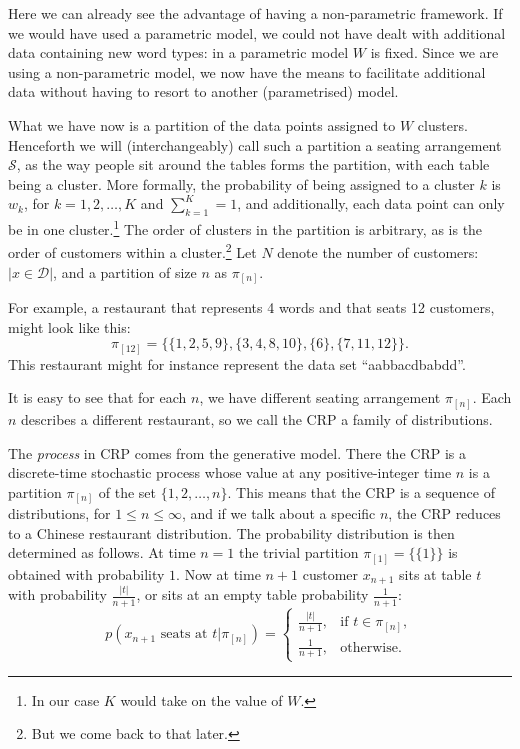 Here we can already see the advantage of having a non-parametric framework. If we would have used a parametric model, we could not have dealt with additional data containing new word types: in a parametric model $W$ is fixed. Since we are using a non-parametric model, we now have the means to facilitate additional data without having to resort to another (parametrised) model.

What we have now is a partition of the data points assigned to $W$ clusters. Henceforth we will (interchangeably) call such a partition a seating arrangement $\mathcal{S}$, as the way people sit around the tables forms the partition, with each table being a cluster. More formally, the probability of being assigned to a cluster $k$ is $w_k$, for $k = 1, 2, \ldots, K$ and $\sum_{k=1}^K = 1$, and additionally, each data point can only be in one cluster.\footnote{In our case $K$ would take on the value of $W$.} The order of clusters in the partition is arbitrary, as is the order of customers within a cluster.\footnote{But we come back to that later.} Let $N$ denote the number of customers: $|x\in\mathcal{D}|$, and a partition of size $n$ as $\pi_{[n]}$. 

For example, a restaurant that represents 4 words and that seats 12 customers, might look like this: 
\begin{equation}\label{eq:partitionexample}
	\pi_{[12]} = \{\{1,2,5,9\},\{3,4,8,10\},\{6\},\{7,11,12\}\}.
\end{equation}
This restaurant might for instance represent the data set ``aabbacdbabdd''. 

It is easy to see that for each $n$, we have different seating arrangement $\pi_{[n]}$. Each $n$ describes a different restaurant, so we call the CRP a family of distributions.

The \emph{process} in CRP comes from the generative model. There the CRP is a discrete-time stochastic process whose value at any positive-integer time $n$ is a partition $\pi_{[n]}$ of the set $\{1,2,\ldots,n\}$. This means that the CRP is a sequence of distributions, for $1\leq n \leq\infty$, and if we talk about a specific $n$, the CRP reduces to a Chinese restaurant distribution. The probability distribution is then determined as follows. At time $n=1$ the trivial partition $\pi_{[1]}=\{\{1\}\}$ is obtained with probability $1$. 
Now at time $n+1$ customer $x_{n+1}$ sits at table $t$ with probability $\frac{|t|}{n+1}$, or sits at an empty table probability $\frac{1}{n+1}$: 
\begin{equation}\label{eq:crp-table}
	p(x_{n+1}\text{ seats at }t|\pi_{[n]}) = 
    \begin{cases}
    	\frac{|t|}{n+1}, & \text{if }t\in\pi_{[n]},\\
    	\frac{1}{n+1}, & \text{otherwise}.
  	\end{cases}
\end{equation}

